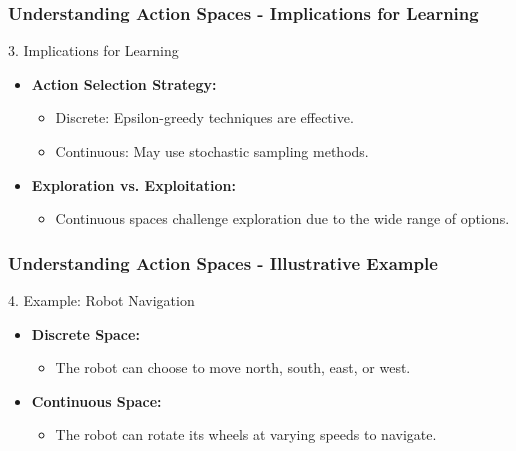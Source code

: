 \documentclass[aspectratio=169]{beamer}
\begin{document}
\begin{frame}[fragile]
    \frametitle{Understanding Action Spaces - Implications for Learning}
    \begin{block}{3. Implications for Learning}
        \begin{itemize}
            \item \textbf{Action Selection Strategy:}
                \begin{itemize}
                    \item Discrete: Epsilon-greedy techniques are effective.
                    \item Continuous: May use stochastic sampling methods.
                \end{itemize}
            \item \textbf{Exploration vs. Exploitation:}
                \begin{itemize}
                    \item Continuous spaces challenge exploration due to the wide range of options.
                \end{itemize}
        \end{itemize}
    \end{block}
\end{frame}

\begin{frame}[fragile]
    \frametitle{Understanding Action Spaces - Illustrative Example}
    \begin{block}{4. Example: Robot Navigation}
        \begin{itemize}
            \item \textbf{Discrete Space:} 
                \begin{itemize}
                    \item The robot can choose to move north, south, east, or west.
                \end{itemize}
            \item \textbf{Continuous Space:} 
                \begin{itemize}
                    \item The robot can rotate its wheels at varying speeds to navigate.
                \end{itemize}
        \end{itemize}
    \end{block}
\end{frame}
\end{document}
